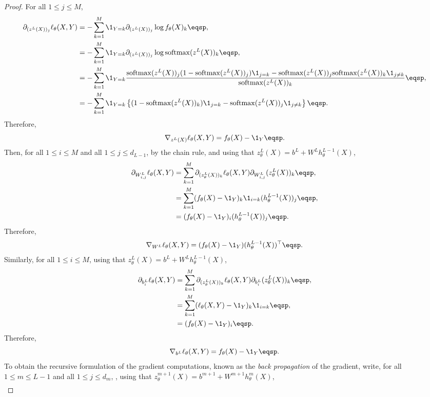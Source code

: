 \begin{proof}
For all $1\leqslant j\leqslant M$,
\begin{align*}
\partial_{(z^L(X))_j}\ell_{\theta}(X,Y) &=  -\sum_{k=1}^{M} \1_{Y=k}\partial_{(z^L(X))_j}\log f_{\theta}(X)_k\eqsp,\\
&=  -\sum_{k=1}^{M} \1_{Y=k}\partial_{(z^L(X))_j}\log \mathrm{softmax}(z^L(X))_k\eqsp,\\
&=  -\sum_{k=1}^{M} \1_{Y=k}\frac{\mathrm{softmax}(z^L(X))_j (1-\mathrm{softmax}(z^L(X))_j )\1_{j=k} - \mathrm{softmax}(z^L(X))_j \mathrm{softmax}(z^L(X))_k\1_{j\neq k}}{\mathrm{softmax}(z^L(X))_k}\eqsp,\\
&=  -\sum_{k=1}^{M} \1_{Y=k}\left\{(1-\mathrm{softmax}(z^L(X))_k )\1_{j=k} -  \mathrm{softmax}(z^L(X))_j\1_{j\neq k}\right\}\eqsp.
\end{align*}
Therefore,
$$
\nabla_{z^L(X)} \ell_{\theta}(X,Y) = f_{\theta}(X) - \1_Y\eqsp.
$$
Then, for all $1\leqslant i\leqslant M$ and all $1\leqslant j \leqslant d_{L-1}$, by the chain rule, and using that $z_{\theta}^L(X) = b^L + W^Lh_{\theta}^{L-1}(X)$,
\begin{align*}
\partial_{W^L_{i,j}}\ell_{\theta}(X,Y) &=  \sum_{k=1}^{M} \partial_{(z_{\theta}^L(X))_k}\ell_{\theta}(X,Y)\partial_{W^L_{i,j}}(z_{\theta}^L(X))_k\eqsp,\\
&=  \sum_{k=1}^{M} (f_{\theta}(X) - \1_Y)_k\1_{i=k}(h_{\theta}^{L-1}(X))_j\eqsp,\\
&=  (f_{\theta}(X) - \1_Y)_i(h_{\theta}^{L-1}(X))_j\eqsp.
\end{align*}
Therefore,
$$
\nabla_{W^L} \ell_{\theta}(X,Y) = (f_{\theta}(X) - \1_Y)(h_{\theta}^{L-1}(X))^\top\eqsp.
$$
Similarly, for all $1\leqslant i\leqslant M$,  using that $z_{\theta}^L(X) = b^L + W^Lh_{\theta}^{L-1}(X)$,
\begin{align*}
\partial_{b^L_{i}}\ell_{\theta}(X,Y) &=  \sum_{k=1}^{M} \partial_{(z_{\theta}^L(X))_k}\ell_{\theta}(X,Y)\partial_{b^L_{i}}(z_{\theta}^L(X))_k\eqsp,\\
&=  \sum_{k=1}^{M} (\ell_{\theta}(X,Y) - \1_Y)_k\1_{i=k}\eqsp,\\
&=  (f_{\theta}(X) - \1_Y)_i\eqsp.
\end{align*}
Therefore,
$$
\nabla_{b^L} \ell_{\theta}(X,Y) = f_{\theta}(X) - \1_Y\eqsp.
$$
To obtain the recursive formulation of the gradient computations, known as the {\em back propagation} of the gradient, write, for all $1\leqslant m \leqslant L-1$ and all $1\leqslant j \leqslant d_m$, ,  using that $z_{\theta}^{m+1}(X) = b^{m+1} + W^{m+1}h_{\theta}^{m}(X)$,
\begin{align*}

\end{align*}
\end{proof}
